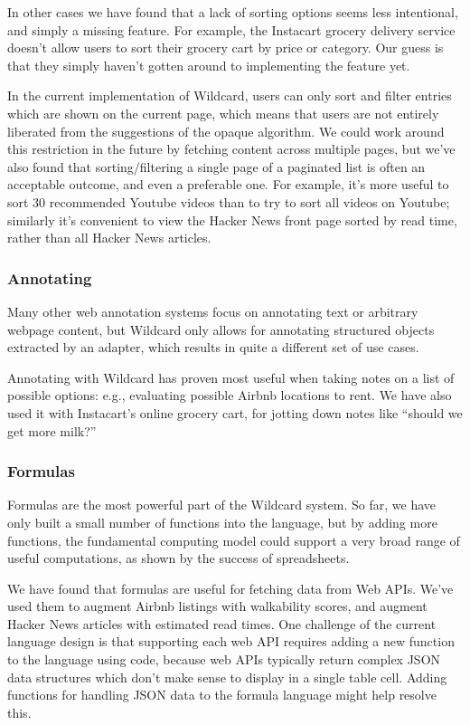 \documentclass[sigplan,10pt,anonymous,review]{acmart}
\begin{document}
In other cases we have found that a lack of sorting options seems less
intentional, and simply a missing feature. For example, the Instacart
grocery delivery service doesn't allow users to sort their grocery cart
by price or category. Our guess is that they simply haven't gotten
around to implementing the feature yet.

In the current implementation of Wildcard, users can only sort and
filter entries which are shown on the current page, which means that
users are not entirely liberated from the suggestions of the opaque
algorithm. We could work around this restriction in the future by
fetching content across multiple pages, but we've also found that
sorting/filtering a single page of a paginated list is often an
acceptable outcome, and even a preferable one. For example, it's more
useful to sort 30 recommended Youtube videos than to try to sort all
videos on Youtube; similarly it's convenient to view the Hacker News
front page sorted by read time, rather than all Hacker News articles.

\hypertarget{annotating}{%
\subsubsection{Annotating}\label{annotating}}

Many other web annotation systems focus on annotating text or arbitrary
webpage content, but Wildcard only allows for annotating structured
objects extracted by an adapter, which results in quite a different set
of use cases.

Annotating with Wildcard has proven most useful when taking notes on a
list of possible options: e.g., evaluating possible Airbnb locations to
rent. We have also used it with Instacart's online grocery cart, for
jotting down notes like ``should we get more milk?''

\hypertarget{formulas}{%
\subsubsection{Formulas}\label{formulas}}

Formulas are the most powerful part of the Wildcard system. So far, we
have only built a small number of functions into the language, but by
adding more functions, the fundamental computing model could support a
very broad range of useful computations, as shown by the success of
spreadsheets.

We have found that formulas are useful for fetching data from Web APIs.
We've used them to augment Airbnb listings with walkability scores, and
augment Hacker News articles with estimated read times. One challenge of
the current language design is that supporting each web API requires
adding a new function to the language using code, because web APIs
typically return complex JSON data structures which don't make sense to
display in a single table cell. Adding functions for handling JSON data
to the formula language might help resolve this.
\end{document}
